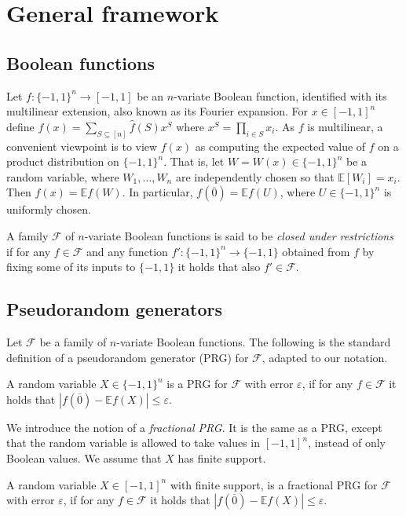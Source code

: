 \documentclass{toc}
\newcommand{\E}{\mathbb{E}}
\newcommand{\FF}{\mathcal{F}}
\newcommand{\eps}{\varepsilon}
\newcommand{\zero}{\overline{0}}
\begin{document}
\section{General framework}
\label{sec:framework}

\subsection{Boolean functions}
Let $f:\{-1,1\}^n \to [-1,1]$ be an $n$-variate Boolean function, identified with its multilinear extension,
also known as its Fourier expansion. For $x \in [-1,1]^n$ define $f(x) = \sum_{S \subseteq [n]} \hat{f}(S)x^S$ where  $x^S = \prod_{i \in S} x_i$.
As $f$ is multilinear, a convenient viewpoint is to view $f(x)$ as computing the expected value of $f$ on a product distribution on $\{-1,1\}^n$. That is, let $W=W(x) \in \{-1,1\}^n$ be a random variable, where $W_1,\ldots,W_n$ are independently chosen so that $\E[W_i]=x_i$. Then $f(x)=\E f(W)$. In particular, $f(\zero) = \E f(U)$, where $U \in \{-1,1\}^n$ is uniformly chosen.

A family $\FF$ of $n$-variate Boolean functions
is said to be \emph{closed under restrictions} if for any $f \in \FF$ and any function
$f':\{-1,1\}^n \to \{-1,1\}$ obtained from $f$ by fixing some of its inputs to $\{-1,1\}$ it holds that also $f' \in \FF$.

\subsection{Pseudorandom generators}

Let $\FF$ be a family of $n$-variate Boolean functions. The following is the standard definition of a
pseudorandom generator (PRG) for $\FF$, adapted to our notation.

\begin{definition}[PRG]
A random variable $X \in \{-1,1\}^n$ is a PRG for $\FF$ with error $\eps$, if for any $f \in \FF$ it holds that
$\left| f(\zero) - \E f(X) \right| \le \eps$.
\end{definition}

We introduce the notion of a \emph{fractional PRG}. It is the same as a PRG, except that the random variable is allowed to take  values in $[-1,1]^n$,
instead of only Boolean values. We assume that $X$ has finite support.
 
\begin{definition}
A random variable $X \in [-1,1]^n$ with finite support, is a fractional PRG for $\FF$ with error $\eps$, if for any $f \in \FF$ it holds that
$\left| f(\zero) - \E f(X) \right| \le \eps$.
\end{definition}
\end{document}
